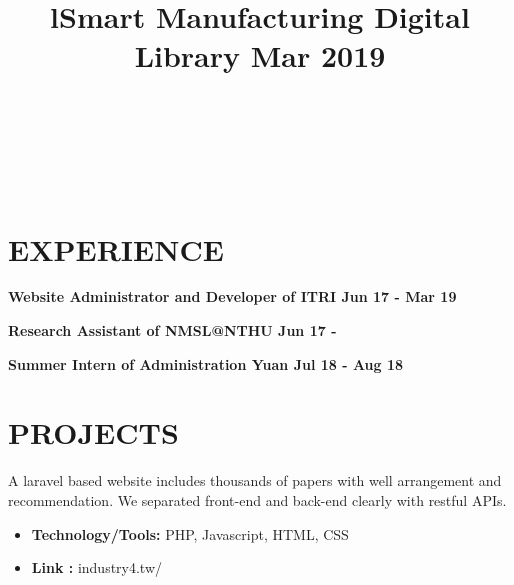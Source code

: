 \documentclass[margin]{res}
\begin{document}
\begin{resume}
\begin{format}
\title{l}\\
\\
\body\\
\end{format}

\section{EXPERIENCE}

\textbf{Website Administrator and Developer of ITRI \hfill{Jun 17 - Mar 19}\\}

\textbf{Research Assistant of NMSL@NTHU \hfill{Jun 17 - }\\}

\textbf{Summer Intern of Administration Yuan \hfill{Jul 18 - Aug 18}\\}


\section{PROJECTS}
\location{}
\title{\textbf{Smart Manufacturing Digital Library \hfill Mar 2019}
 }
\begin{position}
A laravel based website includes thousands of papers with well arrangement and recommendation. We separated  front-end and back-end clearly with restful APIs.
\begin{itemize}
\item \textbf{Technology/Tools:} PHP, Javascript, HTML, CSS
\end{itemize}
\begin{itemize}
\item \textbf{Link :} industry4.tw/
\end{itemize}
\end{position}


\end{resume}
\end{document}
